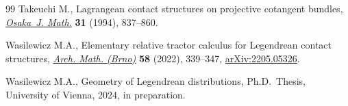 \documentclass[10pt,a4paper]{amsart}
\numberwithin{equation}{section}
\begin{document}
\begin{thebibliography}{99}
Takeuchi M., Lagrangean contact structures on projective cotangent bundles,
 \href{https://doi.org/10.18910/9312}{\textit{Osaka~J. Math.}} \textbf{31} (1994), 837--860.

Wasilewicz M.A., Elementary relative tractor calculus for {L}egendrean contact
 structures, \href{https://doi.org/10.5817/AM2022-5-339}{\textit{Arch. Math. (Brno)}} \textbf{58} (2022), 339--347,
 \href{https://arxiv.org/abs/2205.05326}{arXiv:2205.05326}.

Wasilewicz M.A., Geometry of {L}egendrean distributions, Ph.D.~Thesis,
 {U}niversity of Vienna, 2024, in preparation.


\end{thebibliography}
\end{document}
